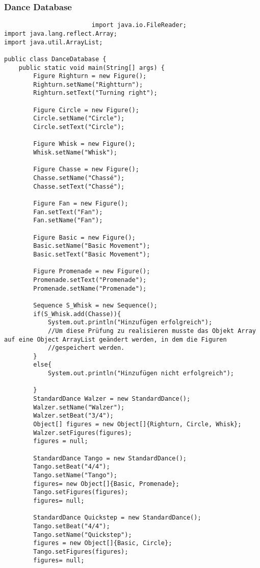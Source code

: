 \documentclass[12pt,a4paper,oneside,ngerman]{article}
\begin{document}
				\subsubsection{Dance Database}
					\begin{verbatim}
						import java.io.FileReader;
import java.lang.reflect.Array;
import java.util.ArrayList;

public class DanceDatabase {
    public static void main(String[] args) {
        Figure Righturn = new Figure();
        Righturn.setName("Rightturn");
        Righturn.setText("Turning right");

        Figure Circle = new Figure();
        Circle.setName("Circle");
        Circle.setText("Circle");

        Figure Whisk = new Figure();
        Whisk.setName("Whisk");

        Figure Chasse = new Figure();
        Chasse.setName("Chassé");
        Chasse.setText("Chassé");

        Figure Fan = new Figure();
        Fan.setText("Fan");
        Fan.setName("Fan");

        Figure Basic = new Figure();
        Basic.setName("Basic Movement");
        Basic.setText("Basic Movement");

        Figure Promenade = new Figure();
        Promenade.setText("Promenade");
        Promenade.setName("Promenade");

        Sequence S_Whisk = new Sequence();
        if(S_Whisk.add(Chasse)){
            System.out.println("Hinzufügen erfolgreich");
            //Um diese Prüfung zu realisieren musste das Objekt Array auf eine Object ArrayList geändert werden, in dem die Figuren
            //gespeichert werden.
        }
        else{
            System.out.println("Hinzufügen nicht erfolgreich");

        }
        StandardDance Walzer = new StandardDance();
        Walzer.setName("Walzer");
        Walzer.setBeat("3/4");
        Object[] figures = new Object[]{Righturn, Circle, Whisk};
        Walzer.setFigures(figures);
        figures = null;

        StandardDance Tango = new StandardDance();
        Tango.setBeat("4/4");
        Tango.setName("Tango");
        figures= new Object[]{Basic, Promenade};
        Tango.setFigures(figures);
        figures= null;

        StandardDance Quickstep = new StandardDance();
        Tango.setBeat("4/4");
        Tango.setName("Quickstep");
        figures = new Object[]{Basic, Circle};
        Tango.setFigures(figures);
        figures= null;


\end{verbatim}
\end{document}
